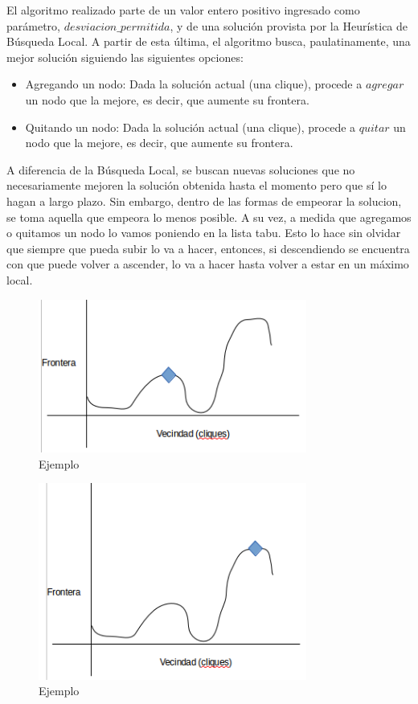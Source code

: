  El algoritmo realizado parte de un valor entero positivo ingresado como parámetro, $desviacion\_permitida$, y de una solución provista por la Heurística de Búsqueda Local. A partir de esta última, el algoritmo busca, paulatinamente, una mejor solución siguiendo las siguientes opciones:
\begin{itemize}
 \item Agregando un nodo: Dada la solución actual (una clique), procede a $agregar$ un nodo que la mejore, es decir, que aumente su frontera.
 \item Quitando un nodo: Dada la solución actual (una clique), procede a $quitar$ un nodo que la mejore, es decir, que aumente su frontera.
\end{itemize}
A diferencia de la Búsqueda Local, se buscan nuevas soluciones que no necesariamente mejoren la solución obtenida hasta el momento pero que sí lo hagan a largo plazo. Sin embargo, dentro de las formas de empeorar la solucion, se toma aquella que empeora lo menos posible. A su vez, a medida que agregamos o quitamos un nodo lo vamos poniendo en la lista tabu. Esto lo hace sin olvidar que siempre que pueda subir lo va a hacer, entonces, si descendiendo se encuentra con que puede volver a ascender, lo va a hacer hasta volver a estar en un máximo local.\newline

\begin{figure}[H] %
\begin{center}
\includegraphics[width=250pt]{../imgs/1_tabu.png}
\caption{Ejemplo}
\end{center}
\end{figure}


\begin{figure}[H] %
\begin{center}
\includegraphics[width=250pt]{../imgs/2_tabu.png}
\caption{Ejemplo}
\end{center}
\end{figure}

